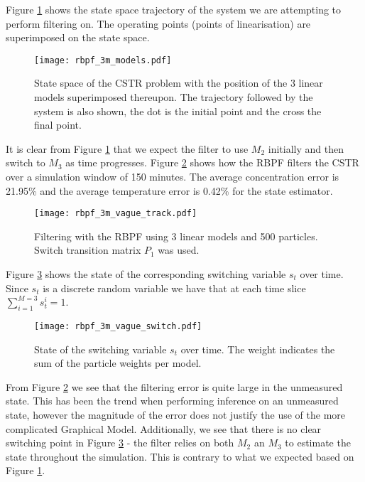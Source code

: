 Figure \ref{fig_3m_models} shows the state space trajectory of the system we are attempting to perform filtering on. The operating points (points of linearisation) are superimposed on the state space.
\begin{figure}[H] 
\centering
\texttt{[image: rbpf\_3m\_models.pdf]}
\caption{State space of the CSTR problem with the position of the 3 linear models superimposed thereupon. The trajectory followed by the system is also shown, the dot is the initial point and the cross the final point.}
\label{fig_3m_models}
\end{figure}
It is clear from Figure \ref{fig_3m_models} that we expect the filter to use $M_2$ initially and then switch to $M_3$ as time progresses. Figure \ref{fig_3m_vage_track} shows how the RBPF filters the CSTR over a simulation window of 150 minutes. The average concentration error is 21.95\% and the average temperature error is 0.42\% for the state estimator.
\begin{figure}[H] 
\centering
\texttt{[image: rbpf\_3m\_vague\_track.pdf]}
\caption{Filtering with the RBPF using 3 linear models and 500 particles. Switch transition matrix $P_1$ was used.}
\label{fig_3m_vage_track}
\end{figure}
Figure \ref{fig_3m_vage_switch} shows the state of the corresponding switching variable $s_t$ over time. Since $s_t$ is a discrete random variable we have that at each time slice $\sum_{i=1}^{M=3} s_t^i = 1$.
\begin{figure}[H] 
\centering
\texttt{[image: rbpf\_3m\_vague\_switch.pdf]}
\caption{State of the switching variable $s_t$ over time. The weight indicates the sum of the particle weights per model.}
\label{fig_3m_vage_switch}
\end{figure}
From Figure \ref{fig_3m_vage_track} we see that the filtering error is quite large in the unmeasured state. This has been the trend when performing inference on an unmeasured state, however the magnitude of the error does not justify the use of the more complicated Graphical Model. Additionally, we see that there is no clear switching point in Figure \ref{fig_3m_vage_switch} - the filter relies on both $M_2$ an $M_3$ to estimate the state throughout the simulation. This is contrary to what we expected based on Figure \ref{fig_3m_models}.

